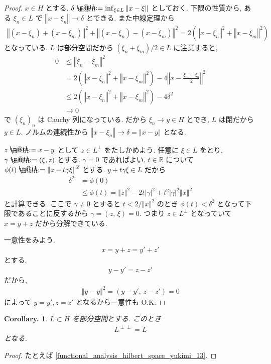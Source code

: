 \documentclass[openany, a4paper, oneside]{jsbook}
\makeatletter
\newcommand*{\defeq}{\mathrel{\rlap{%
\raisebox{0.3ex}{$\m@th\cdot$}}%
\raisebox{-0.3ex}{$\m@th\cdot$}}%
=}
\theoremstyle{break}
\newtheorem{cor}[thm]{Corollary.}
\theoremstyle{breakdefn}
\newcommand{\abs}[1]{\left|#1\right|}
\newcommand{\norm}[1]{\left\Vert#1\right\Vert}
\newcommand{\rbk}[1]{\left (#1\right)}
\newcommand{\rbkt}[2]{\left ( #1,\,#2 \right)}
\makeatother
\begin{document}
\begin{proof}
$x \in H$ とする.
$\delta \defeq \inf_{\xi \in L} \norm{x - \xi}$ としておく.
下限の性質から, ある $\xi_n \in L$ で
$\norm{x - \xi_n} \to \delta$ とできる.
また中線定理から
\begin{align}
 \norm{\rbk{x - \xi_n} + \rbk{x - \xi_m}}^2 + \norm{\rbk{x - \xi_n} - \rbk{x - \xi_m}}^2
 =
  2 \rbk{\norm{x - \xi_n}^2 + \norm{x - \xi_m}^2}
\end{align}
となっている.
$L$ は部分空間だから $\rbk{\xi_n + \xi_m} / 2 \in L$ に注意すると,
\begin{align}
 0
 &\le
 \norm{\xi_n - \xi_m}^2 \\
 &=
 2 \rbk{\norm{x - \xi_n}^2 + \norm{x - \xi_m}^2}
  -4 \norm{x - \frac{\xi_m + \xi_n}{2}}^2 \\
 &\le
 2 \rbk{\norm{x - \xi_n}^2 + \norm{x - \xi_m}^2} - 4 \delta^2 \\
 &\to 0
\end{align}
で $(\xi_n)_n$ は Cauchy 列になっている.
だから $\xi_n \to y \in H$ とでき, $L$ は閉だから $y \in L$.
ノルムの連続性から $\norm{x - \xi_n} \to \delta = \norm{x - y}$ となる.

$z \defeq x-y$ として $z \in L^{\perp}$ をたしかめよう.
任意に $\xi \in L$ をとり, $\gamma \defeq (\xi, z)$ とする.
$\gamma = 0$ であればよい.
$t \in \mathbb{R}$ について $\phi(t) \defeq \norm{z - t \gamma \xi}^2$ とする.
$y + t \gamma \xi \in L$ だから
\begin{align}
 \delta^2
 &=
  \phi(0) \\
 &\le
  \phi(t)
 =
 \norm{z}^2 - 2 t \abs{\gamma}^2 + t^2 \abs{\gamma}^2 \norm{x}^2
\end{align}
と計算できる.
ここで $\gamma \neq 0$ とすると $t < 2 / \norm{x}^2$ のとき
$\phi(t) < \delta^2$ となって下限であることに反するから $\gamma = \rbkt{z}{\xi} = 0$.
つまり $z \in L^{\perp}$ となっていて $x = y + z$ だから分解できている.

一意性をみよう.
\begin{align}
 x
 =
 y + z
 =
 y' + z'
\end{align}
とする.
\begin{align}
 y - y'
 =
 z - z'
\end{align}
だから,
\begin{align}
 \norm{y - y}^2
 =
 \rbkt{y - y'}{z - z'}
 =
 0
\end{align}
によって $y=y', z=z'$ となるから一意性も O.K.
\end{proof}

\begin{cor}
 $L \subset H$ を部分空間とする.
 このとき
 \begin{align}
   L^{\perp \perp} = \overline{L}
 \end{align}
 となる.
\end{cor}
\begin{proof}
たとえば \ref{functional_analysis_hilbert_space_yukimi_13}.
\end{proof}
\end{document}
